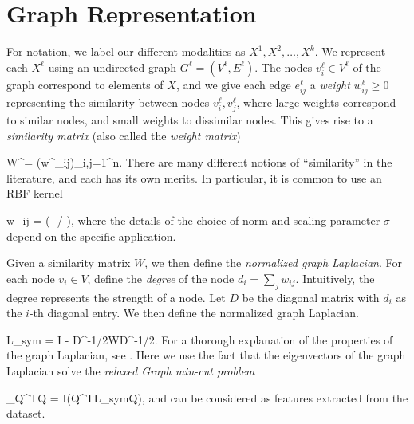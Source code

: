 \documentclass[journal]{IEEEtran}
\newenvironment{myalign}{\par\nobreak\noindent\align}{\endalign}
\begin{document}
%
\section{Graph Representation}
\label{sec:GraphRep}
For notation, we label our different modalities as $X^1,X^2,\ldots,X^k$.  We
represent each $X^{\ell}$ using an undirected graph $G^\ell =
(V^\ell,E^\ell)$. The nodes $v^\ell_i\in V^\ell$ of the graph correspond to
elements of $X$, and we give each edge $e^\ell_{ij}$ a \emph{weight}
$w^\ell_{ij}\geq 0$ representing the similarity between nodes
$v^\ell_i, v^\ell_j$, where large weights correspond to similar nodes, and small
weights to dissimilar nodes. This gives rise to a \emph{similarity matrix} (also
called the \emph{weight matrix})
\begin{myalign}
  W^\ell = \left(w^\ell_{ij}\right)_{i,j=1}^n.
\end{myalign}
There are many different notions of ``similarity'' in the literature, and each
has its own merits. In particular, it is common to use an RBF kernel
\begin{myalign}
  w_{ij} = \left(- / \sigma \right),
\end{myalign}
where the details of the choice of norm and scaling parameter $\sigma$ depend on
the specific application.

Given a similarity matrix $W$, we then define the \emph{normalized graph
  Laplacian}.  For each node $v_i\in V$, define the \emph{degree} of the node
$d_i = \sum_j w_{ij}.$ Intuitively, the degree represents the strength of a
node. Let $D$ be the diagonal matrix with $d_i$ as the $i$-th diagonal entry. We
then define the normalized graph Laplacian.
\begin{myalign}
  L_{sym} = I - D^{-1/2}WD^{-1/2}.
\end{myalign}
For a thorough explanation of the properties of the graph Laplacian, see
\cite{Mohar91}. Here we use the fact that the eigenvectors of the graph
Laplacian solve the \emph{relaxed Graph min-cut problem}
\begin{myalign}
  _{Q^TQ = I}\left(Q^TL_{sym}Q\right),
\end{myalign}
and can be considered as features extracted from the dataset.
\vspace*{-0.5cm}
\end{document}
